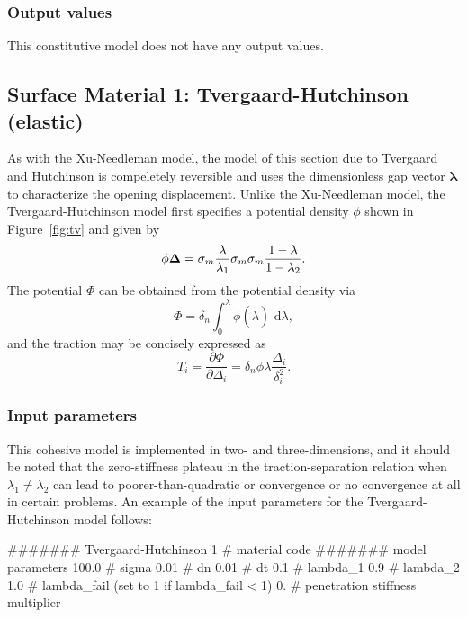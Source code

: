 \subsubsection{Output values}
This constitutive model does not have any output values.

\subsection{Surface Material 1: Tvergaard-Hutchinson (elastic)}
\label{sect.material.surface.tv}
As with the Xu-Needleman model, the model of this section due to Tvergaard
and Hutchinson \cite{Tvergaard1992} is compeletely reversible and uses
the dimensionless gap vector $\boldsymbol{\lambda}$ to characterize the
opening displacement. Unlike the Xu-Needleman model, the Tvergaard-Hutchinson
model first specifies a potential density $\phi$ shown in Figure~\ref{fig:tv} 
and given by
\begin{equation}
\phi{\bf{\Delta}} = \sigma_m \frac{\lambda}{\lambda_1}
	\sigma_m 
     \sigma_m \frac{1-\lambda}{1-\lambda_2}.
\end{equation} 
The potential $\Phi$ can be obtained from the potential density via
\begin{equation}
\Phi = \delta_n \int_0^\lambda \phi(\tilde{\lambda}) \mbox{\ d}\tilde{\lambda},
\end{equation}
and the traction may be concisely expressed as
\begin{equation}
\label{eq.tvt}
T_i = \frac{\partial \Phi}{\partial \Delta_i} = \delta_n \phi{\lambda} \frac{\Delta_i}{\delta_i^2}.
\end{equation}

\subsubsection{Input parameters}
This cohesive model is implemented in two- and three-dimensions, and it should
be noted that the zero-stiffness plateau in the traction-separation relation
when $\lambda_1 \neq \lambda_2$ can lead to poorer-than-quadratic or 
convergence or no convergence at all in certain problems. 
An example of the input parameters for the Tvergaard-Hutchinson model 
follows: 
\begin{inputfile}
####### Tvergaard-Hutchinson
1     # material code
####### model parameters
100.0 # sigma 
0.01  # dn
0.01  # dt
0.1   # lambda_1
0.9   # lambda_2
1.0   # lambda_fail (set to 1 if lambda_fail < 1)
0.    # penetration stiffness multiplier
\end{inputfile}

